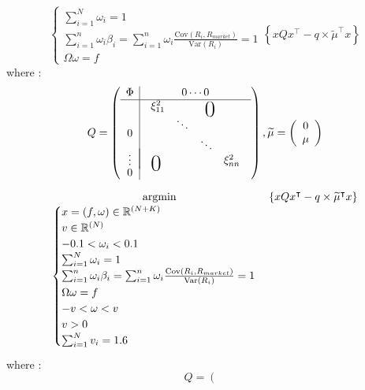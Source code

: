 \documentclass[a4, 14pts]{seminar}
\newcommand\bigzero{\makebox(0,0){\text{\huge0}}}
\newcommand{\Var}{\mathrm{Var}}
\newcommand{\Cov}{\mathrm{Cov}}
\begin{document}
{{{{{\begin{slide}
\begin{equation}
{\begin{cases}
\sum_{i=1}^{N}\omega_i = 1\\
\sum_{i=1}^{n} \omega_i \beta_i =\sum_{i=1}^{n} \omega_i \frac{\Cov \left(R_i,R_{market} \right)}{\Var (R_i)} = 1 \\
\Omega \omega = f
\end{cases}
}\left\{  x Q x^\intercal - q\times \widetilde{\mu}^\intercal x\right\}
\end{equation}
where :
\begin{equation}
\displaystyle
Q=\left(
\begin{array}{c|c}
  \Phi & 0 \cdots 0 \\ \hline
  0 & \begin{array}{cccc}
\xi_{11}^2&& \ \ \bigzero \\
&\ddots\\
&&\ddots\\
\bigzero \ &&& \xi_{nn}^2
\end{array} \\[-4ex]
  \vdots & \\[-0.5ex]
  0 &
\end{array}
\right),\displaystyle
\widetilde{\mu}=\left(
\begin{array}{c}
  0  \\
  \mu 
\end{array}
\right)
\end{equation}
\end{slide}
}
\begin{slide}
\begin{equation}
\displaystyle
\operatornamewithlimits{argmin}_{\begin{cases}
x=(f,\omega) \in \mathbb{R}^{(N+K)}\\
v \in \mathbb{R}^{(N)}\\
-0.1<\omega_i<0.1\\
\sum_{i=1}^{N}\omega_i = 1\\
\sum_{i=1}^{n} \omega_i \beta_i =\sum_{i=1}^{n} \omega_i \frac{\Cov \left(R_i,R_{market} \right)}{\Var (R_i)} = 1 \\
\Omega \omega = f \\
-v<\omega<v \\
v > 0 \\
\sum_{i=1}^{N}v_i = 1.6
\end{cases}
}\left\{  x Q x^\intercal - q\times \widetilde{\mu}^\intercal x\right\}
\end{equation}
where :
\begin{equation}
\displaystyle
Q=\left(
\begin{array}{c|c}

\end{array}
\end{equation}
\end{slide}}}}}
\end{document}
